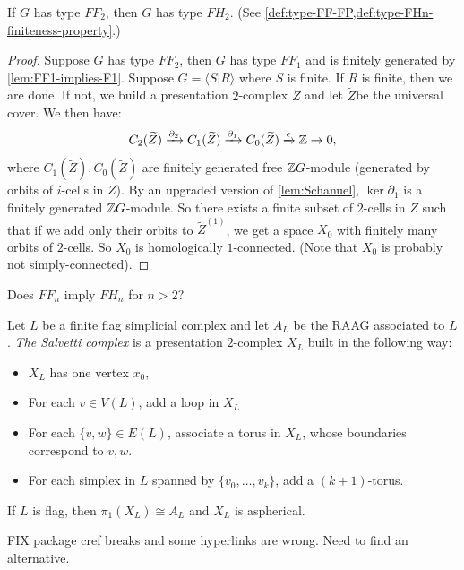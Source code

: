 \begin{proposition}
    \label{prop:FF2-implies-FH2}
    If \(G\) has type \(FF_2\), then \(G\) has type \(FH_2\). (See \cref{def:type-FF-FP,def:type-FHn-finiteness-property}.)
\end{proposition}
\begin{proof}
    Suppose \(G\) has type \(FF_2\), then \(G\) has type \(FF_1\) and is finitely generated by \cref{lem:FF1-implies-F1}. Suppose \(G = \langle S|R\rangle\) where \(S\) is finite. If \(R\) is finite, then we are done. If not, we build a presentation \(2\)-complex \(Z\) and let \(\tilde Z\)be the universal cover. We then have:
    \[C_2(\widetilde Z) \xrightarrow{\partial_2} C_1(\widetilde Z) \xrightarrow{\partial_1} C_0(\widetilde Z) \xrightarrow{\epsilon} \mathbb{Z} \to 0,\]
    where \(C_1(\tilde Z), C_0(\tilde Z)\) are finitely generated free \(\mathbb{Z} G\)-module (generated by orbits of \(i\)-cells in \(Z\)). By an upgraded version of \cref{lem:Schanuel}, \(\ker \partial_1\) is a finitely generated \(\mathbb{Z} G\)-module. So there exists a finite subset of \(2\)-cells in \(Z\) such that if we add only their orbits to \(\tilde Z^{(1)}\), we get a space \(X_0\) with finitely many orbits of \(2\)-cells. So \(X_0\) is homologically \(1\)-connected. (Note that \(X_0\) is probably not simply-connected).
\end{proof}

\begin{question}
    \label{q:FFn-implies-FHn}
    Does \(FF_n\) imply \(FH_n\) for \(n>2\)?
\end{question}

\begin{definition}
    \label{def:Salvetti-complex}
    Let \(L\) be a finite flag simplicial complex and let \(A_L\) be the RAAG associated to \(L\). \emph{The Salvetti complex} is a presentation \(2\)-complex \(X_L\) built in the following way:
    \begin{itemize}
        \item \(X_L\) has one vertex \(x_0\),
        \item For each \(v\in V(L)\), add a loop in \(X_L\)
        \item For each \(\{v,w\}\in E(L)\), associate a torus in \(X_L\), whose boundaries correspond to \(v,w\).
        \item For each simplex in \(L\) spanned by \(\{v_0,\dots,v_k\}\), add a \((k+1)\)-torus.
    \end{itemize}
\end{definition}

If \(L\) is flag, then \(\pi_1(X_L)\cong A_L\) and \(X_L\) is aspherical.


FIX package cref breaks and some hyperlinks are wrong. Need to find an alternative. %